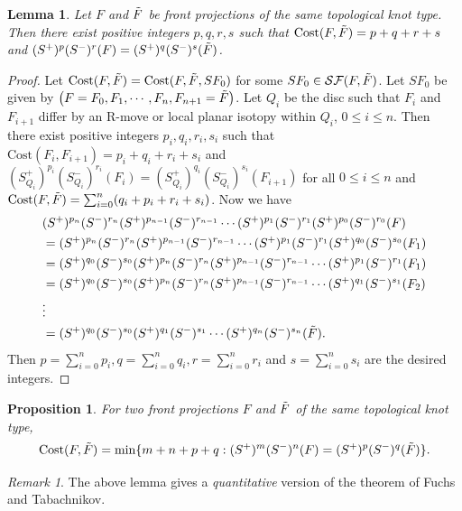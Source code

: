 \documentclass[11pt]{amsart}
\numberwithin{equation}{section}
\theoremstyle{plain}
\newtheorem{Lemma}[equation]{Lemma}
\newtheorem{proposition}[equation]{Proposition}
\theoremstyle{definition}
\theoremstyle{remark} \newtheorem{remark}[equation]{Remark}
\theoremstyle{remark} \newtheorem{observation}[equation]{Observation}
\newcommand{\Cost}{\text{Cost}}
\begin{document}
\begin{Lemma}\label{CostL5}
     Let $F$ and $\Tilde{F}$ be front projections of the same topological knot type. Then there exist positive integers $p,q,r,s$ such that  $\Cost(F,\Tilde{F})=p+q+r+s$ and $(S^+)^p(S^-)^r(F)=(S^+)^q(S^-)^s(\Tilde{F})$. 
\end{Lemma}   
\begin{proof}
  Let $\Cost(F,\Tilde{F})=\Cost(F,\Tilde{F},SF_0)$ for some $SF_0\in \mathcal{SF}(F,\Tilde{F})$. Let $SF_0$ be given by $\left(F=F_0,F_1,\cdots,F_n,F_{n+1}=\Tilde{F}\right)$. Let $Q_{i}$ be the disc such that $F_i$ and $F_{i+1}$ differ by an R-move or local planar isotopy within $Q_i$, $ 0\leq i \leq n$. Then there exist positive integers $p_i,q_i,r_i,s_i$ such that $\Cost(F_i,F_{i+1})=p_{i}+q_{i}+r_i+s_i$ and $(S^+_{Q_i})^{p_{i}}(S^-_{Q_i})^{r_i}(F_i)=(S^+_{Q_i})^{q_{i}}(S^-_{Q_i})^{s_{i}}(F_{i+1})$ for all $ 0\leq i \leq n$ and $\Cost(F,\Tilde{F})=\sum_{i=0}^n(q_{i}+p_{i}+r_i+s_i)$. Now we have
  \begin{align*}
      &(S^+)^{p_n}(S^-)^{r_n}(S^+)^{p_{n-1}}(S^-)^{r_{n-1}}\cdots (S^+)^{p_1}(S^-)^{r_1}(S^+)^{p_{0}}(S^-)^{r_0}(F)\\
      &=(S^+)^{p_{n}}(S^-)^{r_n}(S^+)^{p_{n-1}}(S^-)^{r_{n-1}}\cdots (S^+)^{p_{1}}(S^-)^{r_1} (S^+)^{q_0}(S^-)^{s_0}(F_1)\\
      &=(S^+)^{q_0}(S^-)^{s_0}(S^+)^{p_{n}}(S^-)^{r_n}(S^+)^{p_{n-1}}(S^-)^{r_{n-1}}\cdots (S^+)^{p_{1}}(S^-)^{r_1}(F_1)\\
      &=(S^+)^{q_0}(S^-)^{s_0}(S^+)^{p_{n}}(S^-)^{r_n}(S^+)^{p_{n-1}}(S^-)^{r_{n-1}}\cdots (S^+)^{q_{1}}(S^-)^{s_1}(F_2)\\
      &\vdots \\
      &=(S^+)^{q_0}(S^-)^{s_0}(S^+)^{q_1}(S^-)^{s_1}\cdots (S^+)^{q_{n}}(S^-)^{s_n}(\Tilde{F}).
  \end{align*}
  Then $p=\sum_{i=0}^np_i, q=\sum_{i=0}^nq_i, r=\sum_{i=0}^nr_i$ and $s=\sum_{i=0}^ns_i$ are the desired integers.
\end{proof}
\begin{proposition}\label{minpropn}
For two front projections $F$ and $\Tilde{F}$ of the same topological knot type, $$\Cost(F,\Tilde{F})=\min\{m+n+p+q:(S^+)^m(S^-)^n(F)=(S^+)^p(S^-)^q(\Tilde{F})\}.$$
\end{proposition}
\begin{remark}
    The above lemma gives a \emph{quantitative} version of the theorem of Fuchs and Tabachnikov.
\end{remark}
\end{document}

